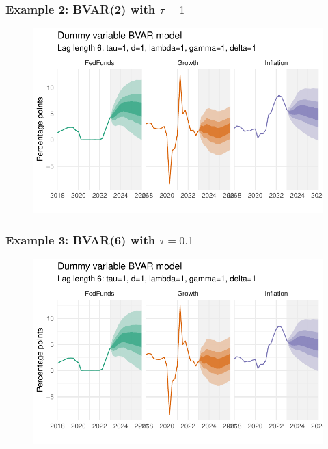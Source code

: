 \documentclass[
  letterpaper,
]{book}
\begin{document}
\hypertarget{example-2-bvar2-with-tau1}{%
\subsubsection{\texorpdfstring{Example 2: BVAR(2) with
\(\tau=1\)}{Example 2: BVAR(2) with \textbackslash tau=1}}\label{example-2-bvar2-with-tau1}}

\begin{figure}

{\centering \includegraphics{./BVAR_files/figure-pdf/estim-1.pdf}

}

\end{figure}

\hypertarget{example-3-bvar6-with-tau0.1}{%
\subsubsection{\texorpdfstring{Example 3: BVAR(6) with
\(\tau=0.1\)}{Example 3: BVAR(6) with \textbackslash tau=0.1}}\label{example-3-bvar6-with-tau0.1}}

\begin{figure}

{\centering \includegraphics{./BVAR_files/figure-pdf/estim-1.pdf}

}

\end{figure}
\end{document}
